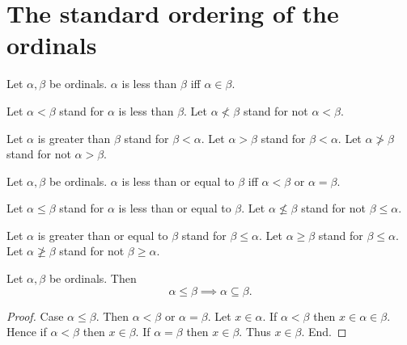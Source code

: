 \documentclass[../set-theory.tex]{subfiles}
\begin{document}
  \section{The standard ordering of the ordinals}

  \begin{forthel}
    \begin{definition}\label{SET_THEORY_15_6654252130762752}
      Let $\alpha, \beta$ be ordinals.
      $\alpha$ is less than $\beta$ iff $\alpha \in \beta$.
    \end{definition}

    Let $\alpha < \beta$ stand for $\alpha$ is less than $\beta$.
    Let $\alpha \nless \beta$ stand for not $\alpha < \beta$.

    Let $\alpha$ is greater than $\beta$ stand for $\beta < \alpha$.
    Let $\alpha > \beta$ stand for $\beta < \alpha$.
    Let $\alpha \ngtr \beta$ stand for not $\alpha > \beta$.
  \end{forthel}

  \begin{forthel}
    \begin{definition}\label{SET_THEORY_15_2639956210089984}
      Let $\alpha, \beta$ be ordinals.
      $\alpha$ is less than or equal to $\beta$ iff $\alpha < \beta$ or
      $\alpha = \beta$.
    \end{definition}

    Let $\alpha \leq \beta$ stand for $\alpha$ is less than or equal to $\beta$.
    Let $\alpha \nleq \beta$ stand for not $\beta \leq \alpha$.

    Let $\alpha$ is greater than or equal to $\beta$ stand for
    $\beta \leq \alpha$.
    Let $\alpha \geq \beta$ stand for $\beta \leq \alpha$.
    Let $\alpha \ngeq \beta$ stand for not $\beta \geq \alpha$.
  \end{forthel}

  \begin{forthel}
    \begin{proposition}\label{SET_THEORY_15_3089369577553920}
      Let $\alpha, \beta$ be ordinals.
      Then \[ \alpha \leq \beta \implies \alpha \subseteq \beta. \]
    \end{proposition}
    \begin{proof}
      Case $\alpha \leq \beta$.
        Then $\alpha < \beta$ or $\alpha = \beta$.
        Let $x \in \alpha$.
        If $\alpha < \beta$ then $x \in \alpha \in \beta$.
        Hence if $\alpha < \beta$ then $x \in \beta$.
        If $\alpha = \beta$ then $x \in \beta$.
        Thus $x \in \beta$.
      End.
    \end{proof}
  \end{forthel}
\end{document}

